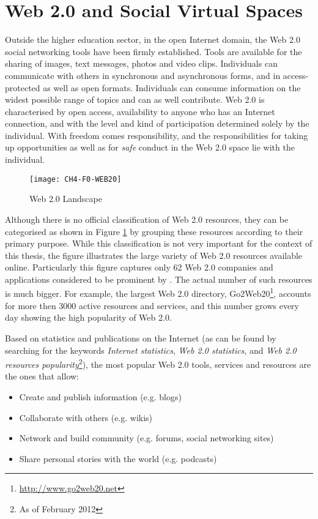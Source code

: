 \section{Web 2.0 and Social Virtual Spaces}
Outside the higher education sector, in the open Internet domain, the Web 2.0
social networking tools have been firmly established. Tools are available for
the sharing of images, text messages, photos and video clips. Individuals can
communicate with others in synchronous and asynchronous forms, and in
access-protected as well as open formats. Individuals can consume information on
the widest possible range of topics and can as well contribute. Web 2.0 is
characterised by open access, availability to anyone who has an Internet
connection, and with the level and kind of participation determined solely by
the individual. With freedom comes responsibility, and the responsibilities for
taking up opportunities as well as for \textit{safe} conduct in the Web 2.0
space lie with the individual.

\begin{figure}[htb]
\centering
\texttt{[image: CH4-F0-WEB20]}
\caption[Web 2.0 Landscape]{Web 2.0 Landscape \citep{Dawson2007}}
\label{fig:web20l}
\end{figure}

Although there is no official classification of Web 2.0 resources, they can be
categorised as shown in Figure \ref{fig:web20l} by grouping these resources
according to their primary purpose. While this classification is not very
important for the context of this thesis, the figure illustrates the large
variety of Web 2.0 resources available online. Particularly this figure captures
only 62 Web 2.0 companies and applications considered to be prominent by
\citet{Dawson2007}. The actual number of such resources is much bigger. For
example, the largest Web 2.0 directory,
Go2Web20\footnote{\url{http://www.go2web20.net}}, accounts for more then 3000
active resources and services, and this number grows every day showing the high
popularity of Web 2.0.

Based on statistics and publications on the Internet (as can be found by
searching for the keywords \textit{Internet statistics}, \textit{Web 2.0 statistics}, and \textit{Web 2.0
resources popularity}\footnote{As of February 2012}), the most popular Web 2.0
tools, services and resources are the ones that allow:

\begin{itemize}
  \item Create and publish information (e.g. blogs) 
  \item Collaborate with others (e.g. wikis)
  \item Network and build community (e.g. forums, social networking sites)
  \item Share personal stories with the world (e.g. podcasts)
\end{itemize}

